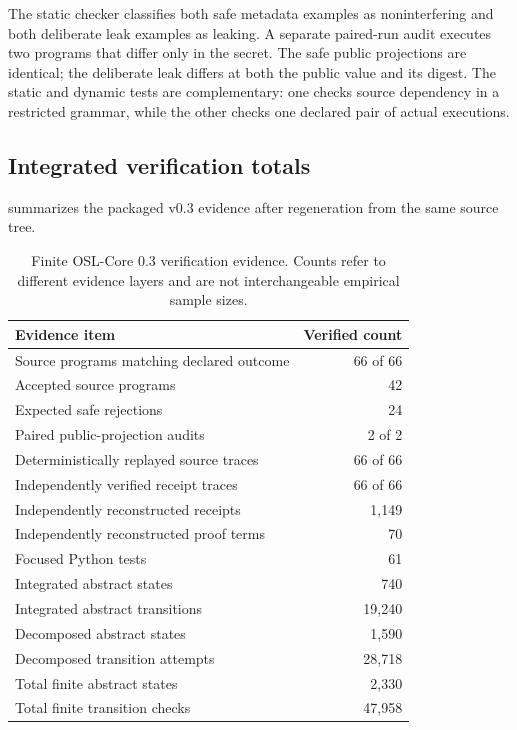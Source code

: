 The static checker classifies both safe metadata examples as noninterfering and both deliberate leak examples as leaking.  A separate paired-run audit executes two programs that differ only in the secret.  The safe public projections are identical; the deliberate leak differs at both the public value and its digest.  The static and dynamic tests are complementary: one checks source dependency in a restricted grammar, while the other checks one declared pair of actual executions.

\subsection{Integrated verification totals}

 summarizes the packaged v0.3 evidence after regeneration from the same source tree.

\begin{table}[ht]
\centering
\begin{tabular}{lr}
\toprule
Evidence item & Verified count \\
\midrule
Source programs matching declared outcome & 66 of 66 \\
Accepted source programs & 42 \\
Expected safe rejections & 24 \\
Paired public-projection audits & 2 of 2 \\
Deterministically replayed source traces & 66 of 66 \\
Independently verified receipt traces & 66 of 66 \\
Independently reconstructed receipts & 1,149 \\
Independently reconstructed proof terms & 70 \\
Focused Python tests & 61 \\
Integrated abstract states & 740 \\
Integrated abstract transitions & 19,240 \\
Decomposed abstract states & 1,590 \\
Decomposed transition attempts & 28,718 \\
Total finite abstract states & 2,330 \\
Total finite transition checks & 47,958 \\
\bottomrule
\end{tabular}
\caption{Finite OSL-Core 0.3 verification evidence.  Counts refer to different evidence layers and are not interchangeable empirical sample sizes.}
\label{tab:v03-evidence}
\end{table}


